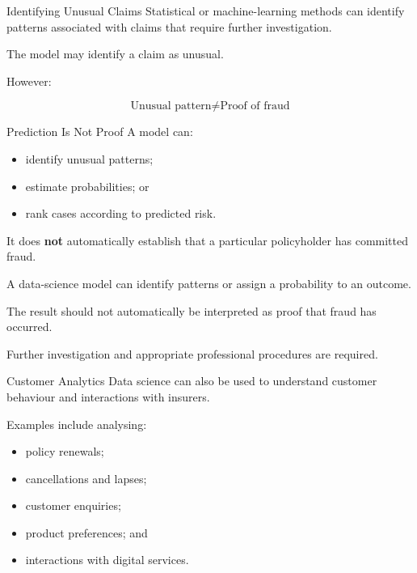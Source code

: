 \documentclass[
  ignorenonframetext,
  aspectratio=169,
]{beamer}
\providecommand{\tightlist}{%
  \setlength{\itemsep}{0pt}\setlength{\parskip}{0pt}}
\begin{document}
\begin{frame}{Identifying Unusual Claims}
\protect{}\label{identifying-unusual-claims}
Statistical or machine-learning methods can identify patterns associated
with claims that require further investigation.

The model may identify a claim as unusual.

However:

\[
\boxed{
\text{Unusual pattern}
\neq
\text{Proof of fraud}
}
\]
\end{frame}

\begin{frame}{Prediction Is Not Proof}
\protect{}\label{prediction-is-not-proof}
A model can:

\begin{itemize}
\tightlist
\item
  identify unusual patterns;
\item
  estimate probabilities; or
\item
  rank cases according to predicted risk.
\end{itemize}

It does \textbf{not} automatically establish that a particular
policyholder has committed fraud.

\begin{tcolorbox}[enhanced jigsaw, arc=.35mm, bottomrule=.15mm, bottomtitle=1mm, breakable, colback=white, colbacktitle=quarto-callout-important-color!10!white, colframe=quarto-callout-important-color-frame, coltitle=black, left=2mm, leftrule=.75mm, opacityback=0, opacitybacktitle=0.6, rightrule=.15mm, title=\textcolor{quarto-callout-important-color}{\faExclamation}\hspace{0.5em}{Prediction is not proof}, titlerule=0mm, toprule=.15mm, toptitle=1mm]

A data-science model can identify patterns or assign a probability to an
outcome.

The result should not automatically be interpreted as proof that fraud
has occurred.

Further investigation and appropriate professional procedures are
required.

\end{tcolorbox}
\end{frame}

\begin{frame}{Customer Analytics}
\protect{}\label{customer-analytics}
Data science can also be used to understand customer behaviour and
interactions with insurers.

Examples include analysing:

\begin{itemize}
\tightlist
\item
  policy renewals;
\item
  cancellations and lapses;
\item
  customer enquiries;
\item
  product preferences; and
\item
  interactions with digital services.
\end{itemize}
\end{frame}
\end{document}
